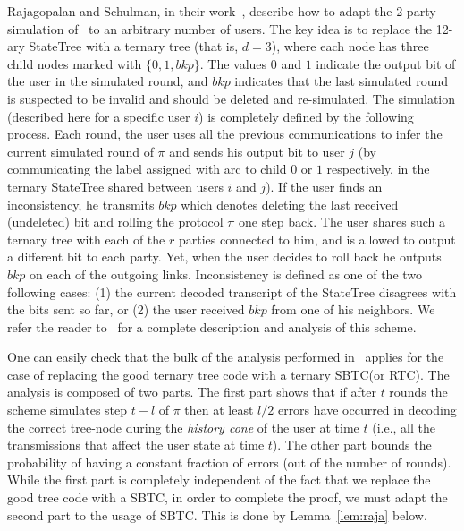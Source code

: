 \documentclass[ letterpaper, 11pt]{article}
\newcommand{\statetree}{{\textsf{StateTree}}\xspace}
\newcommand{\RTBC}{\textsf{RTC}\xspace}
\newcommand{\KTC}{\textsf{SBTC}\xspace}
\begin{document}
Rajagopalan and Schulman, in their work~\cite{RS94},
describe how to adapt the 2-party simulation of~\cite{schulman96}
to an arbitrary number of users. The key idea is to replace the 12-ary \statetree
with a ternary tree (that is, $d=3$),
where each node has three child nodes marked with $\{0,1,bkp\}$.
The values $0$ and $1$ indicate the output bit of the user in the simulated round,
and $bkp$ indicates that the last simulated round is suspected to be invalid
and should be  deleted and re-simulated.
The simulation (described here for a specific user $i$)
is completely defined by the following process. Each round, the user uses all the previous communications to infer the current simulated round of $\pi$ and sends his output bit to user $j$ (by communicating the label assigned with arc to child  $0$ or $1$ respectively,
in the ternary \statetree shared between users $i$ and $j$).
If the user finds an inconsistency, he transmits
$bkp$ which denotes deleting the last received (undeleted) bit and rolling the protocol $\pi$ one step back. The user shares such a ternary tree with each of the $r$ parties connected to him, and is allowed
to output a different bit to each party. Yet, when the user decides to roll back he outputs
$bkp$ on each of the outgoing links. Inconsistency is defined as one of the two following cases:
(1) the current decoded transcript of the \statetree disagrees with the bits sent so far, or (2)
the user received $bkp$ from one of his neighbors.
We refer the reader to~\cite{RS94} for a complete description and analysis of this scheme.


One can easily check that the bulk of the analysis performed in~\cite{RS94} applies
for the case of replacing the good ternary tree code with a ternary \KTC (or \RTBC).
The analysis is composed of two parts. The first part shows that if after
$t$ rounds the scheme simulates step $t-l$ of $\pi$ then at least
$l/2$ errors have occurred in decoding the correct tree-node during
the \emph{history cone} of the user at time $t$ (i.e., all the transmissions
that affect the user state at time $t$). The other part
bounds the probability of having a constant fraction of errors (out of the number of rounds).
While the first part is completely independent of the
fact that we replace the good tree code with a \KTC,
in order to complete the proof, we must adapt the second part to the usage of \KTC. This is done by
Lemma~\ref{lem:raja} below.
\end{document}
